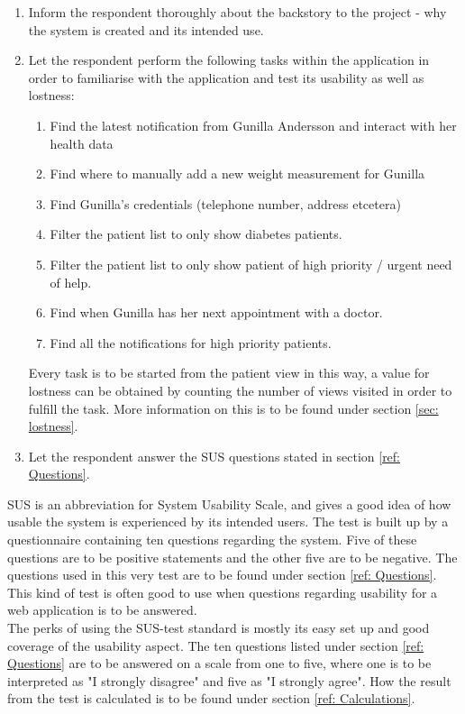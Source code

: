 \documentclass[12pt]{article}
\begin{document}
    \begin{enumerate}
        \item Inform the respondent thoroughly about the backstory to the project - why the system is created and its intended use. 
        \item Let the respondent perform the following tasks within the application in order to familiarise with the application and test its usability as well as lostness:
        \begin{enumerate}
            \item Find the latest notification from Gunilla Andersson and interact with her health data
            \item Find where to manually add a new weight measurement for Gunilla
            \item Find Gunilla's credentials (telephone number, address etcetera)
            \item Filter the patient list to only show diabetes patients.
            \item Filter the patient list to only show patient of high priority / urgent need of help.
            \item Find when Gunilla has her next appointment with a doctor.
            \item Find all the notifications for high priority patients.
        \end{enumerate}
        Every task is to be started from the patient view in this way, a value for lostness can be obtained by counting the number of views visited in order to fulfill the task. More information on this is to be found under section \ref{sec: lostness}.
        \item Let the respondent answer the SUS questions stated in section \ref{ref: Questions}.
    \end{enumerate}
    SUS is an abbreviation for System Usability Scale, and gives a good idea of how usable the system is experienced by its intended users. The test is built up by a questionnaire containing ten questions regarding the system. Five of these questions are to be positive statements and the other five are to be negative. The questions used in this very test are to be found under section \ref{ref: Questions}. This kind of test is often good to use when questions regarding usability for a web application is to be answered. \\
    
    The perks of using the SUS-test standard is mostly its easy set up and good coverage of the usability aspect. The ten questions listed under section \ref{ref: Questions} are to be answered on a scale from one to five, where one is to be interpreted as "I strongly disagree" and five as "I strongly agree". How the result from the test is calculated is to be found under section \ref{ref: Calculations}. 
    
\end{document}
